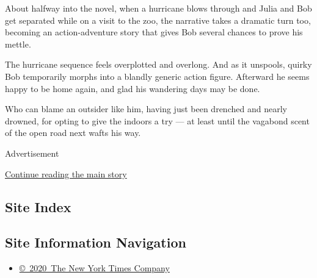 About halfway into the novel, when a hurricane blows through and Julia
and Bob get separated while on a visit to the zoo, the narrative takes a
dramatic turn too, becoming an action-adventure story that gives Bob
several chances to prove his mettle.

The hurricane sequence feels overplotted and overlong. And as it
unspools, quirky Bob temporarily morphs into a blandly generic action
figure. Afterward he seems happy to be home again, and glad his
wandering days may be done.

Who can blame an outsider like him, having just been drenched and nearly
drowned, for opting to give the indoors a try --- at least until the
vagabond scent of the open road next wafts his way.

Advertisement

\protect\hyperlink{after-bottom}{Continue reading the main story}

\hypertarget{site-index}{%
\subsection{Site Index}\label{site-index}}

\hypertarget{site-information-navigation}{%
\subsection{Site Information
Navigation}\label{site-information-navigation}}

\begin{itemize}
\tightlist
\item
  \href{https://help.nytimes3xbfgragh.onion/hc/en-us/articles/115014792127-Copyright-notice}{©~2020~The
  New York Times Company}
\end{itemize}

